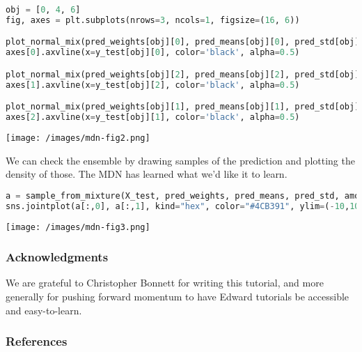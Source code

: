 \begin{lstlisting}[language=Python]
obj = [0, 4, 6]
fig, axes = plt.subplots(nrows=3, ncols=1, figsize=(16, 6))

plot_normal_mix(pred_weights[obj][0], pred_means[obj][0], pred_std[obj][0], axes[0], comp=False)
axes[0].axvline(x=y_test[obj][0], color='black', alpha=0.5)

plot_normal_mix(pred_weights[obj][2], pred_means[obj][2], pred_std[obj][2], axes[1], comp=False)
axes[1].axvline(x=y_test[obj][2], color='black', alpha=0.5)

plot_normal_mix(pred_weights[obj][1], pred_means[obj][1], pred_std[obj][1], axes[2], comp=False)
axes[2].axvline(x=y_test[obj][1], color='black', alpha=0.5)
\end{lstlisting}

\texttt{[image: /images/mdn-fig2.png]}

We can check the ensemble by drawing samples of the prediction and
plotting the density of those. The MDN has learned what we'd like it
to learn.

\begin{lstlisting}[language=Python]
a = sample_from_mixture(X_test, pred_weights, pred_means, pred_std, amount=len(X_test))
sns.jointplot(a[:,0], a[:,1], kind="hex", color="#4CB391", ylim=(-10,10), xlim=(-14,14))
\end{lstlisting}

\texttt{[image: /images/mdn-fig3.png]}

\subsubsection{Acknowledgments}

We are grateful to Christopher Bonnett for writing this tutorial, and
more generally for pushing forward momentum to have Edward tutorials
be accessible and easy-to-learn.

\subsubsection{References}\label{references}
